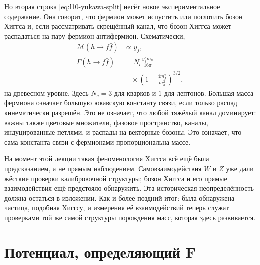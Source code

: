 Но вторая строка \eqref{eq:l10-yukawa-split} несёт новое экспериментальное содержание. Она говорит, что фермион может испустить или поглотить бозон Хиггса и, если рассматривать скрещённый канал, что бозон Хиггса может распадаться на пару фермион-антифермион. Схематически,
\begin{equation}
\begin{aligned}
  \mathcal M(h\to f\bar f)&\propto y_f,
  \\
  \Gamma(h\to f\bar f)
  &=
  N_c\frac{y_f^2m_h}{16\pi}
  \\
  &\quad\times
  \left(1-\frac{4m_f^2}{m_h^2}\right)^{3/2},
\end{aligned}
  \label{eq:l10-higgs-fermion-width}
\end{equation}
на древесном уровне. Здесь \(N_c=3\) для кварков и \(1\) для лептонов. Большая масса фермиона означает большую юкавскую константу связи, если только распад кинематически разрешён. Это не означает, что любой тяжёлый канал доминирует: важны также цветовые множители, фазовое пространство, каналы, индуцированные петлями, и распады на векторные бозоны. Это означает, что сама константа связи с фермионами пропорциональна массе.

\begin{classroomqa}
\end{classroomqa}

На момент этой лекции такая феноменология Хиггса всё ещё была предсказанием, а не прямым наблюдением. Самовзаимодействия \(W\) и \(Z\) уже дали жёсткие проверки калибровочной структуры; бозон Хиггса и его прямые взаимодействия ещё предстояло обнаружить. Эта историческая неопределённость должна остаться в изложении. Как и более поздний итог: была обнаружена частица, подобная Хиггсу, и измерения её взаимодействий теперь служат проверками той же самой структуры порождения масс, которая здесь развивается.

\section{Потенциал, определяющий F}

